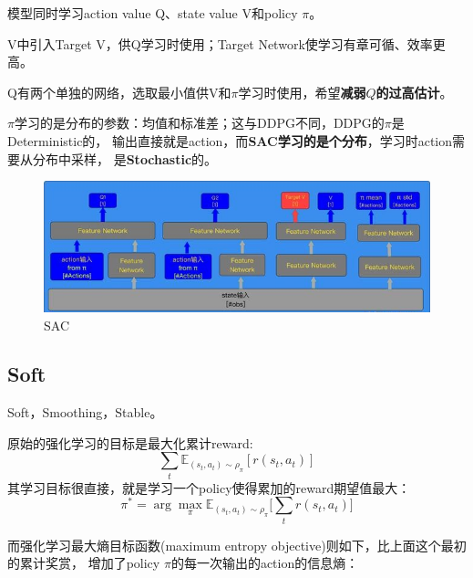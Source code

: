 模型同时学习action value Q、state value V和policy $\pi$。

V中引入Target V，供Q学习时使用；Target Network使学习有章可循、效率更高。

Q有两个单独的网络，选取最小值供V和$\pi$学习时使用，希望{\bf 减弱$Q$的过高估计}。

$\pi$学习的是分布的参数：均值和标准差；这与DDPG不同，DDPG的$\pi$是Deterministic的，
输出直接就是action，而{\bf SAC学习的是个分布}，学习时action需要从分布中采样，
是{\bf Stochastic}的。

\begin{figure}[h]
\centering
\includegraphics[scale=0.7]{pix/sac.jpg}
\caption{SAC}
\end{figure}


\subsection{Soft}

Soft，Smoothing，Stable。

原始的强化学习的目标是最大化累计reward:
\begin{equation}\label{rl_objective_function}
\sum_t\mathbb{E}_{(s_t,a_t)\sim\rho_\pi}\left[r(s_t, a_t)\right]
\end{equation}
其学习目标很直接，就是学习一个policy使得累加的reward期望值最大：
\begin{equation}\label{rl_reward_function}
\pi^* = \arg\max_\pi \mathbb{E}_{(s_t,a_t)\sim\rho_\pi}
\Big[ \sum_t r(s_t, a_t) \Big]
\end{equation}

\noindent 而强化学习最大熵目标函数(maximum entropy objective)则如下，比上面这个最初的累计奖赏，
增加了policy $\pi$的每一次输出的action的信息熵：

